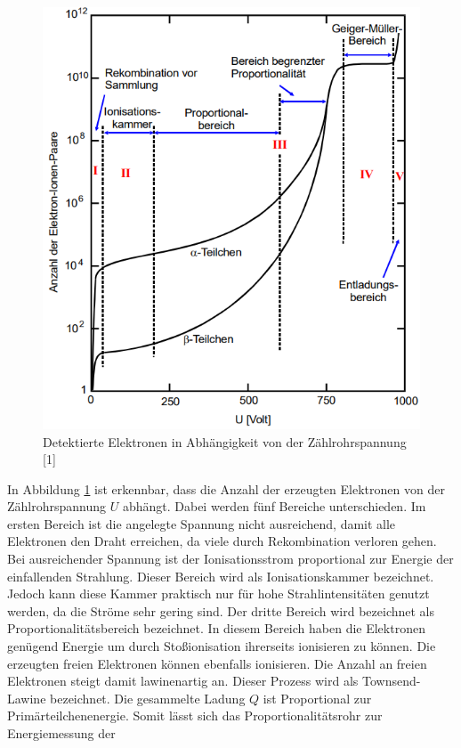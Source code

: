 \begin{figure}
    \centering
    \includegraphics[scale=0.6]{pics/Elektronen.png}
    \caption{Detektierte Elektronen in Abhängigkeit von der Zählrohrspannung [1]}
    \label{fig:Elektronen}
  \end{figure}
In Abbildung \ref{fig:Elektronen} ist erkennbar, dass die Anzahl der erzeugten Elektronen von der Zählrohrspannung $U$ abhängt.
Dabei werden fünf Bereiche unterschieden. Im ersten Bereich ist die angelegte Spannung nicht ausreichend, damit alle Elektronen den Draht erreichen, da viele 
durch Rekombination verloren gehen.
Bei ausreichender Spannung ist der Ionisationsstrom proportional zur Energie der einfallenden Strahlung.
Dieser Bereich wird als Ionisationskammer bezeichnet.
Jedoch kann diese Kammer praktisch nur für hohe Strahlintensitäten genutzt werden, da die Ströme sehr gering sind.
Der dritte Bereich wird bezeichnet als Proportionalitätsbereich bezeichnet. In diesem Bereich haben die 
Elektronen genügend Energie um durch Stoßionisation ihrerseits ionisieren zu können.
Die erzeugten freien Elektronen können ebenfalls ionisieren. Die Anzahl an freien Elektronen steigt damit lawinenartig an. Dieser Prozess wird als
Townsend-Lawine bezeichnet. Die gesammelte Ladung $Q$ ist Proportional zur Primärteilchenenergie. Somit lässt sich das Proportionalitätsrohr zur Energiemessung der
